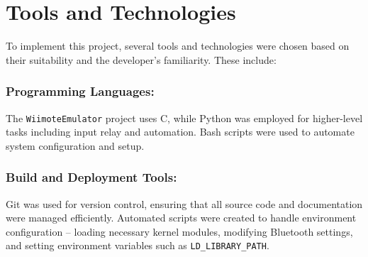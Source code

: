 \section{Tools and Technologies}

To implement this project, several tools and technologies were chosen based on their suitability and the developer’s familiarity. These include:

\subsubsection{Programming Languages:}
The \texttt{WiimoteEmulator} project uses C, while Python was employed for higher-level tasks including input relay and automation. Bash scripts were used to automate system configuration and setup.

\subsubsection{Build and Deployment Tools:}
Git was used for version control, ensuring that all source code and documentation were managed efficiently. Automated scripts were created to handle environment configuration -- loading necessary kernel modules, modifying Bluetooth settings, and setting environment variables such as \texttt{LD\_LIBRARY\_PATH}.
